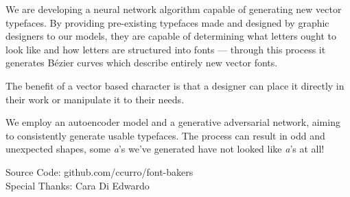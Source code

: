 \documentclass{article}
\begin{document}
\vspace{0.5in}
\hspace*{.1in}
\begin{minipage}{10in}
  \sffamily
  \fontsize{0.63in}{0.74in}\selectfont \raggedright

  We are developing a neural network algorithm capable of generating
  new vector typefaces. By providing pre-existing typefaces made and
  designed by graphic designers to our models, they are capable of
  determining what letters ought to look like and how letters are
  structured into fonts --- through this process it generates Bézier
  curves which describe entirely new vector fonts.

\end{minipage}
\hfill
\begin{minipage}{10in}
  \sffamily
  \fontsize{0.6in}{0.7in}\selectfont
  \raggedright
  \vspace{-0.2in}
  The benefit of a vector based character is that a designer can place
  it directly in their work or manipulate it to their needs.
  \vspace{0.4in}

  We employ an autoencoder model and a generative adversarial
  network, aiming to consistently generate usable typefaces. The process
  can result in odd and unexpected shapes, some {\itshape a}'s
  we've generated have not looked like {\itshape a}'s at all!

  \vspace{0.4in}
  
  \fontsize{0.42in}{0.55in}\selectfont

  Source Code: {\ttfamily github.com/ccurro/font-bakers}\\
  Special Thanks: Cara Di Edwardo
\end{minipage}
\end{document}
